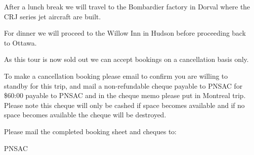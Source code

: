 After a lunch break we will travel to the Bombardier factory in Dorval
where the CRJ series jet aircraft are built.

For dinner we will proceed to the Willow Inn in Hudson before
proceeding back to Ottawa.

As this tour is now sold out we can accept bookings on a cancellation
basis only.

To make a cancellation booking please email
 to confirm you are willing to standby
for this trip, and mail a non-refundable cheque payable to PNSAC for
\$60:00 payable to PNSAC and in the cheque memo please put in Montreal
trip. Please note this cheque will only be cashed if space becomes
available and if no space becomes available the cheque will be
destroyed.

Please mail the completed booking sheet and cheques to:

\address{PNSAC\\
P.O.Box 44005\\
514 Montreal Road\\
Ottawa, ON\\
K1K 4P8}

\begin{footnotesize}
    \raggedleft PNSAC\\
\end{footnotesize}


